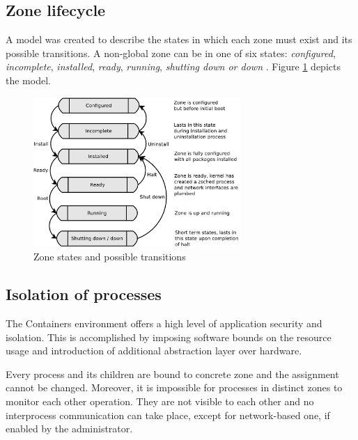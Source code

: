 \documentclass[11pt]{book}
\begin{document}
      \subsection{Zone lifecycle}
      \label{sub:}

        A model was created to describe the states in which each zone must exist and its possible transitions. A non-global zone can be
        in one of six states: \textit{configured}, \textit{incomplete}, \textit{installed}, \textit{ready},
        \textit{running}, \textit{shutting down or down} \cite{sag}. Figure \ref{fig:sol:lifecycle} depicts the model.

        \begin{figure}[H]
          \begin{center}
            \includegraphics[width=0.7\textwidth]{img/solaris/zone_states.pdf}
          \end{center}

          \caption{Zone states and possible transitions}
          \label{fig:sol:lifecycle}
        \end{figure}


      \subsection{Isolation of processes}
      \label{sub:}

        The Containers environment offers a high level of application security and isolation. This is accomplished by
        imposing software bounds on the resource usage and introduction of additional abstraction layer over hardware.

        Every process and its children are bound to concrete zone and the assignment cannot be changed. Moreover, it is
        impossible for processes in distinct zones to monitor each other operation. They are not visible to each other
        and no interprocess communication can take place, except for network-based one, if enabled by the administrator.
\end{document}
